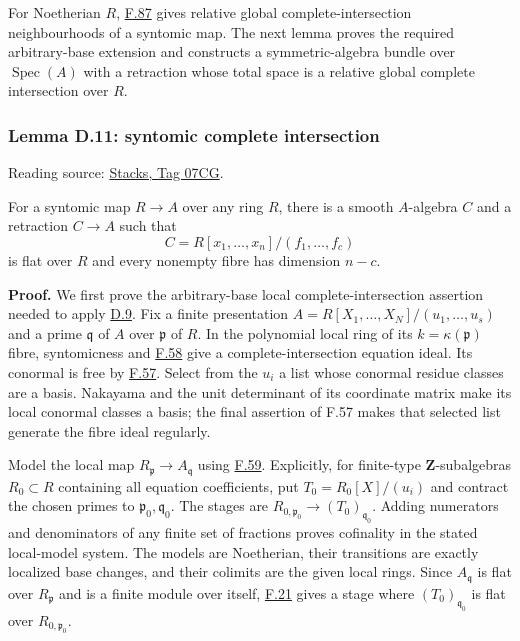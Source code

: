 \documentclass[11pt,a4paper,openany]{report}
\newcounter{none}
\begin{document}
For Noetherian \(R\), \hyperref[AG-RG-S05-algebra-lemma-syntomic]{F.87} gives relative global complete-intersection neighbourhoods of a syntomic map. The next lemma proves the required arbitrary-base extension and constructs a symmetric-algebra bundle over \(\operatorname{Spec}(A)\) with a retraction whose total space is a relative global complete intersection over \(R\).

\label{AG-RG-S05-smoothing-lemma-syntomic-complete-intersection}

\subsubsection{Lemma D.11: syntomic complete intersection}\label{AG-RG-S05-lemma-d.11-syntomic-complete-intersection}

Reading source: \href{https://stacks.math.columbia.edu/tag/07CG}{Stacks, Tag 07CG}.

For a syntomic map \(R\to A\) over any ring \(R\), there is a smooth \(A\)-algebra \(C\) and a retraction \(C\to A\) such that \[C=R[x_1,\ldots,x_n]/(f_1,\ldots,f_c)\] is flat over \(R\) and every nonempty fibre has dimension \(n-c\).

\textbf{Proof.} We first prove the arbitrary-base local complete-intersection assertion needed to apply \hyperref[AG-RG-S05-smoothing-lemma-improve-presentation]{D.9}. Fix a finite presentation \(A=R[X_1,\ldots,X_N]/(u_1,\ldots,u_s)\) and a prime \(\mathfrak q\) of \(A\) over \(\mathfrak p\) of \(R\). In the polynomial local ring of its \(k=\kappa(\mathfrak p)\) fibre, syntomicness and \hyperref[AG-RG-S05-algebra-lemma-lci-at-prime]{F.58} give a complete-intersection equation ideal. Its conormal is free by \hyperref[AG-RG-S05-algebra-lemma-lci]{F.57}. Select from the \(u_i\) a list whose conormal residue classes are a basis. Nakayama and the unit determinant of its coordinate matrix make its local conormal classes a basis; the final assertion of F.57 makes that selected list generate the fibre ideal regularly.

Model the local map \(R_{\mathfrak p}\to A_{\mathfrak q}\) using \hyperref[AG-RG-S05-algebra-lemma-limit-essentially-finite-presentation]{F.59}. Explicitly, for finite-type \(\mathbf Z\)-subalgebras \(R_0\subset R\) containing all equation coefficients, put \(T_0=R_0[X]/(u_i)\) and contract the chosen primes to \(\mathfrak p_0,\mathfrak q_0\). The stages are \(R_{0,\mathfrak p_0}\to(T_0)_{\mathfrak q_0}\). Adding numerators and denominators of any finite set of fractions proves cofinality in the stated local-model system. The models are Noetherian, their transitions are exactly localized base changes, and their colimits are the given local rings. Since \(A_{\mathfrak q}\) is flat over \(R_{\mathfrak p}\) and is a finite module over itself, \hyperref[AG-RG-S05-algebra-lemma-colimit-eventually-flat]{F.21} gives a stage where \((T_0)_{\mathfrak q_0}\) is flat over \(R_{0,\mathfrak p_0}\).
\end{document}
